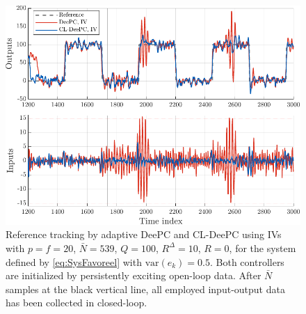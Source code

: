 \begin{figure}
\begin{center}
\includegraphics[width=\columnwidth]{results/figures/fig_prob_sol.pdf}    %
\caption{Reference tracking by adaptive \ac{DeePC} and \ac{CL-DeePC} using \ac{IVs} with $p=f=20$, $\bar{N}=539$, $Q=100$, $R^\Delta=10$, $R=0$, for the system defined by \eqref{eq:SysFavoreel} with $\text{var}(e_k)=0.5$. Both controllers are initialized by persistently exciting open-loop data. After $\bar{N}$ samples at the black vertical line, all employed input-output data has been collected in closed-loop.}  %
\label{fig:CL_Problem_Solution}                                 %
\end{center}                                 %
\end{figure}
